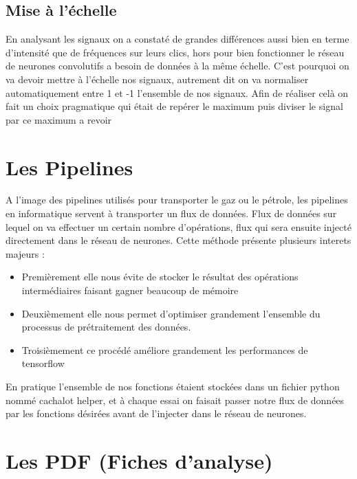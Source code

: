\hypertarget{Mise-a-l-echelle}{%
\subsection{Mise à l'échelle}
\label{Mise-a-l-echelle}}

En analysant les signaux on a constaté de grandes différences aussi bien en terme d'intensité que de fréquences sur leurs clics, hors pour bien fonctionner le réseau de neurones convolutifs a besoin de données à la même échelle. C'est pourquoi on va devoir mettre à l'échelle nos signaux, autrement dit on va normaliser automatiquement entre 1 et -1 l'ensemble de nos signaux.
Afin de réaliser celà on fait un choix pragmatique qui était de repérer le maximum puis diviser le signal par ce maximum
\comment a revoir

\hypertarget{Les-Pipelines}{%
\section{Les Pipelines}
\label{Les-Pipelines}}

A l'image des pipelines utilisés pour transporter le gaz ou le pétrole, les pipelines en informatique servent à transporter un flux de données.
Flux de données sur lequel on va effectuer un certain nombre d'opérations, flux qui sera ensuite injecté directement dans le réseau de neurones.
Cette méthode présente plusieurs interets majeurs :
\begin{itemize}
\item Premièrement elle nous évite de stocker le résultat des opérations intermédiaires  faisant gagner beaucoup de mémoire
\item Deuxièmement elle nous permet d'optimiser grandement l'ensemble du processus de prétraitement des données.
\item Troisièmement ce procédé améliore grandement les performances de tensorflow
\end{itemize}

En pratique l'ensemble de nos fonctions étaient stockées dans un fichier python nommé cachalot helper, et à chaque essai on faisait passer notre flux de données par les fonctions désirées avant de l'injecter dans le réseau de neurones.


\hypertarget{Les-PDF}{%
\section{Les PDF (Fiches d'analyse)}
\label{Les-PDF}}

